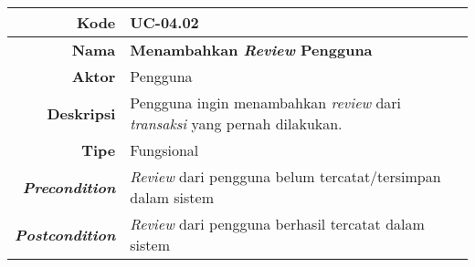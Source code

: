 	\begin{table}[H]
		\centering
		\begin{tabular}{|r|p{8cm}|}
			\hline
			\textbf{Kode}                                                    
			& UC-04.02
			\\ \hline
			\textbf{Nama}                                                    
			& \textbf{ Menambahkan \textit{Review} Pengguna } 
			\\ \hline
			\textbf{Aktor}                                                   
			& Pengguna 
			\\ \hline
			\textbf{Deskripsi}                                               
			& Pengguna ingin menambahkan \textit{review} dari \textit{transaksi} yang pernah dilakukan.
			\\ \hline
			\textbf{Tipe}
			& Fungsional 
			\\ \hline
			
			\textbf{\textit{Precondition}}
			& \textit{Review} dari pengguna belum tercatat/tersimpan dalam sistem

			\\ \hline
			
			\textbf{\textit{Postcondition}} 
			& \textit{Review} dari pengguna berhasil tercatat dalam sistem
			\\ \hline
			

\end{tabular}
\end{table}

